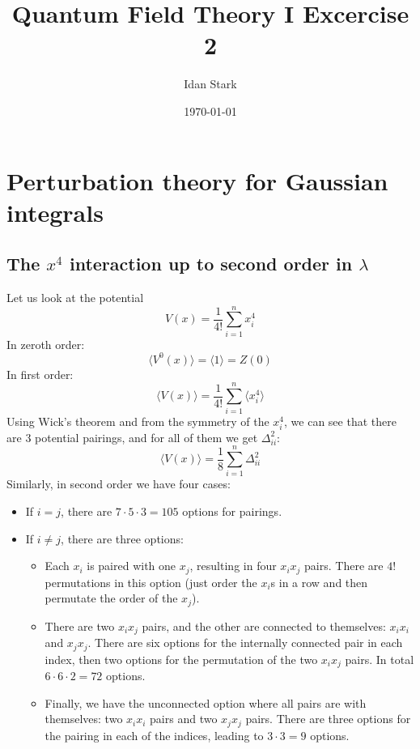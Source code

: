 \documentclass{article}
\title{Quantum Field Theory I Excercise 2}
\author{Idan Stark}
\date{\today}
\begin{document}
\maketitle

\section{Perturbation theory for Gaussian integrals}
\subsection{The $x^4$ interaction up to second order in $\lambda$}
Let us look at the potential
\begin{equation}
    V(x) = \frac{1}{4!}\sum_{i=1}^n x_i^4
\end{equation}
In zeroth order:
\begin{equation}
    \langle V^0(x) \rangle = \langle 1 \rangle = Z(0)
\end{equation}
In first order:
\begin{equation}
    \langle V(x) \rangle = \frac{1}{4!} \sum_{i=1}^n \langle x_i^4 \rangle
\end{equation}
Using Wick's theorem and from the symmetry of the $x_i^4$, we can see that there are $3$ potential pairings, and for all of them we get $\Delta_{ii}^2$:
\begin{equation}
    \langle V(x) \rangle = \frac{1}{8} \sum_{i=1}^n \Delta_{ii}^2
\end{equation}
Similarly, in second order we have four cases:
\begin{itemize}
    \item If $i = j$, there are $7\cdot5\cdot3 = 105$ options for pairings.
    \item If $i \ne j$, there are three options:
    \begin{itemize}
        \item Each $x_i$ is paired with one $x_j$, resulting in four $x_ix_j$ pairs. There are $4!$ permutations in this option (just order the $x_i$s in a row and then permutate the order of the $x_j$).
        \item There are two $x_i x_j$ pairs, and the other are connected to themselves: $x_ix_i$ and $x_jx_j$. There are six options for the internally connected pair in each index, then two options for the permutation of the two $x_ix_j$ pairs. In total $6\cdot6\cdot2 = 72$ options.
        \item Finally, we have the unconnected option where all pairs are with themselves: two $x_ix_i$ pairs and two $x_jx_j$ pairs. There are three options for the pairing in each of the indices, leading to $3\cdot3 = 9$ options.
    \end{itemize}
\end{itemize}
\end{document}
